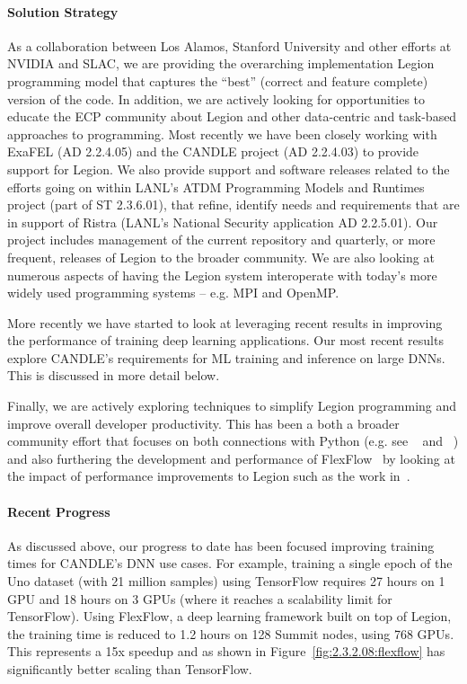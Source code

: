 \paragraph{Solution Strategy}
As a collaboration between Los Alamos, Stanford University and other
efforts at NVIDIA and SLAC, we are providing the overarching
implementation Legion programming model that captures the ``best''
(correct and feature complete) version of the code.  In addition, we
are actively looking for opportunities to educate the ECP community
about Legion and other data-centric and task-based approaches to
programming.  Most recently we have been closely working with ExaFEL (AD
2.2.4.05) and the CANDLE project (AD 2.2.4.03) to provide support for 
Legion.  We also provide support and software releases related to the 
efforts going on within LANL's ATDM Programming Models and Runtimes 
project (part of ST 2.3.6.01), that refine, identify needs and requirements that
are in support of Ristra (LANL's National Security application AD 2.2.5.01). 
Our project includes management of the current repository and quarterly, 
or more frequent, releases of Legion to the broader community.  We are also 
looking at numerous aspects of having the Legion system interoperate with 
today's more widely used programming systems -- e.g. MPI and OpenMP. 

More recently we have started to look at leveraging recent results in 
improving the performance of training deep learning applications.  Our 
most recent results explore CANDLE's requirements for ML training and 
inference on large DNNs. This is discussed in more detail below. 

Finally, we are actively exploring techniques to simplify Legion
programming and improve overall developer productivity.  This has been a 
both a broader community effort that focuses on both connections with 
Python (e.g. see ~\cite{2.3.1.08:Bauer:2019} and ~\cite{2.3.1.08:Slaughter:2019}) 
and also furthering the development and performance of 
FlexFlow~\cite{2.3.1.08:Jia:2018:2} by looking at the impact of performance
improvements to Legion such as the work in~\cite{2.3.1.08:Lee:2018:1}. 


\paragraph{Recent Progress}
As discussed above, our progress to date has been focused improving 
training times for CANDLE's DNN use cases.  For example, training a 
single epoch of the Uno dataset (with 21 million samples) using TensorFlow 
requires 27 hours on 1 GPU and 18 hours on 3 GPUs (where it reaches a 
scalability limit for TensorFlow).  Using FlexFlow, a deep learning
framework built on top of Legion, the training time is reduced to 1.2 hours on 
128 Summit nodes, using 768 GPUs. This represents a 15x speedup and as 
shown in Figure~\ref{fig:2.3.2.08:flexflow} has significantly better scaling 
than TensorFlow.


